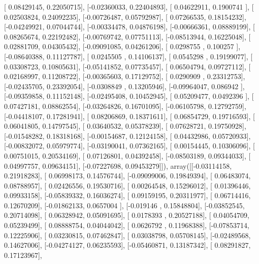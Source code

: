 \documentclass{article}
\begin{document}
       [ 0.08429145,  0.22050715],
       [-0.02360033,  0.22404893],
       [ 0.04622911,  0.1900741 ],
       [ 0.02503824,  0.24092235],
       [-0.00726487,  0.05792987],
       [ 0.07266535,  0.18154232],
       [-0.04249921,  0.07044744],
       [-0.00334478,  0.04876198],
       [-0.00666361,  0.08889199],
       [ 0.08265674,  0.22192482],
       [-0.00769742,  0.07751113],
       [-0.08513944,  0.16225048],
       [ 0.02881709,  0.04305432],
       [-0.09091085,  0.04261206],
       [ 0.0298755 ,  0.100257  ],
       [-0.08640388,  0.11127787],
       [ 0.0245505 ,  0.14106137],
       [ 0.0545298 ,  0.19199077],
       [ 0.03308723,  0.10805631],
       [-0.05141852,  0.07735457],
       [ 0.06504794,  0.09727112],
       [ 0.02168997,  0.11208722],
       [-0.00365603,  0.17129752],
       [ 0.0290909 ,  0.23312753],
       [-0.02435705,  0.23392054],
       [-0.0308849 ,  0.13205946],
       [-0.09964047,  0.086942  ],
       [-0.09359858,  0.11152148],
       [-0.02495408,  0.10452945],
       [ 0.05209477,  0.0492396 ],
       [ 0.07427181,  0.08862554],
       [-0.03264826,  0.16701095],
       [-0.06105798,  0.12792759],
       [-0.04418107,  0.17281941],
       [ 0.08206869,  0.18371611],
       [ 0.06854729,  0.19716593],
       [ 0.06041805,  0.14797545],
       [ 0.03640532,  0.05378239],
       [ 0.07628721,  0.19750928],
       [-0.01548282,  0.18318168],
       [-0.00154687,  0.12124158],
       [ 0.04432986,  0.05720933],
       [-0.00832072,  0.05979774],
       [-0.03190041,  0.07362165],
       [ 0.00154445,  0.10306096],
       [ 0.00751015,  0.20534169],
       [ 0.07126801,  0.04392458],
       [-0.08503189,  0.09344033],
       [ 0.04997757,  0.09634151],
       [-0.07227698,  0.09453279]]), array([[-0.03114158,  0.21918283],
       [ 0.06998173,  0.14576744],
       [-0.09099006,  0.19849394],
       [ 0.06483074,  0.08788957],
       [ 0.02426556,  0.19530716],
       [ 0.00264548,  0.15296012],
       [ 0.01396446,  0.09933158],
       [-0.05839332,  0.16036274],
       [ 0.09159195,  0.20311977],
       [ 0.06714416,  0.12670209],
       [-0.01862133,  0.0657004 ],
       [-0.019146  ,  0.15848804],
       [-0.03852545,  0.20714098],
       [ 0.06328942,  0.05091695],
       [ 0.0178393 ,  0.20527188],
       [ 0.04054709,  0.05239499],
       [ 0.08888754,  0.04044042],
       [ 0.0626792 ,  0.11968388],
       [-0.07853714,  0.12225906],
       [ 0.03230815,  0.07462847],
       [ 0.03038798,  0.05708145],
       [-0.02489568,  0.14627006],
       [-0.04274127,  0.06235593],
       [-0.05460871,  0.13187342],
       [ 0.08291827,  0.17123967],
\end{document}
